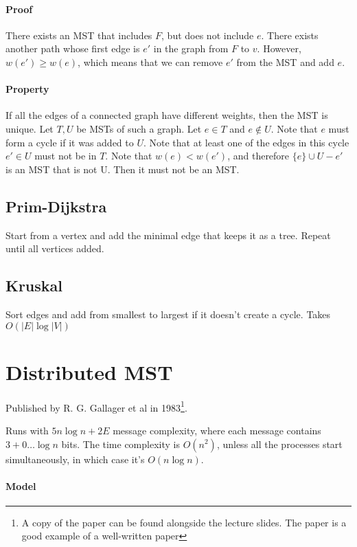 \documentclass{idc_msc}
\begin{document}
\paragraph{Proof}
There exists an MST that includes $F$, but does not include $e$.
There exists another path whose first edge is $e'$ in the graph from $F$ to $v$.
However, $w(e') \ge w(e)$, which means that we can remove $e'$ from the MST and add $e$.

\paragraph{Property}
If all the edges of a connected graph have different weights, then the MST is unique.
Let $T,U$ be MSTs of such a graph.
Let $e\in T$ and $e \notin U$.
Note that $e$ must form a cycle if it was added to $U$.
Note that at least one of the edges in this cycle $e' \in U$ must not be in $T$.
Note that $w(e) < w(e')$, and therefore $\{e\} \cup U - e'$ is an MST that is not U.
Then it must not be an MST.

\subsection{Prim-Dijkstra}
Start from a vertex and add the minimal edge that keeps it as a tree.
Repeat until all vertices added.

\subsection{Kruskal}
Sort edges and add from smallest to largest if it doesn't create a cycle.
Takes $O(|E| \log |V|)$


\clearpage
\section{Distributed MST}
Published by R. G. Gallager et al in 1983\footnote{A copy of the paper can be found alongside the lecture slides. The paper is a good example of a well-written paper}.

Runs with $5 n \log n + 2E$ message complexity, where each message contains $3 + 0 \ldots \log n$ bits.
The time complexity is $O(n^2)$, unless all the processes start simultaneously, in which case it's $O(n \log n)$.

\paragraph{Model}
\end{document}
